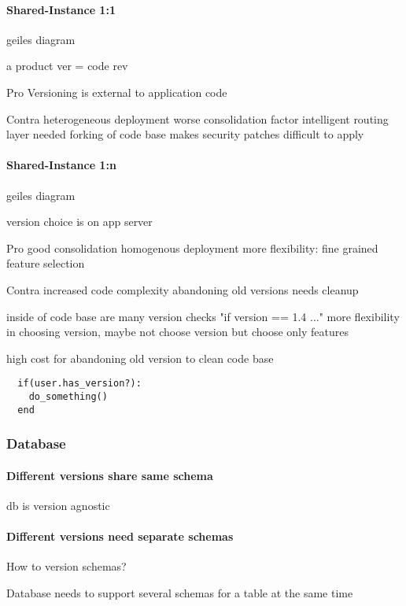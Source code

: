 \paragraph{Shared-Instance 1:1}
geiles diagram

a product ver = code rev


Pro
Versioning is external to application code

Contra
heterogeneous deployment
worse consolidation factor
intelligent routing layer needed
forking of code base makes security patches difficult to apply



\paragraph{Shared-Instance 1:n}
geiles diagram


version choice is on app server


Pro
good consolidation
homogenous deployment
more flexibility: fine grained feature selection

Contra
increased code complexity
abandoning old versions needs cleanup



inside of code base are many version checks "if version == 1.4 ..."
more flexibility in choosing version, maybe not choose version but choose only features

high cost for abandoning old version to clean code base

\lstset{language=Ruby, caption=code snippet, label=code}
\begin{lstlisting}
  if(user.has_version?):
    do_something()
  end
\end{lstlisting}

\subsubsection{Database}

\paragraph{Different versions share same schema}
db is version agnostic

\paragraph{Different versions need separate schemas}
How to version schemas?

  Database needs to support several schemas for a table at the same time

